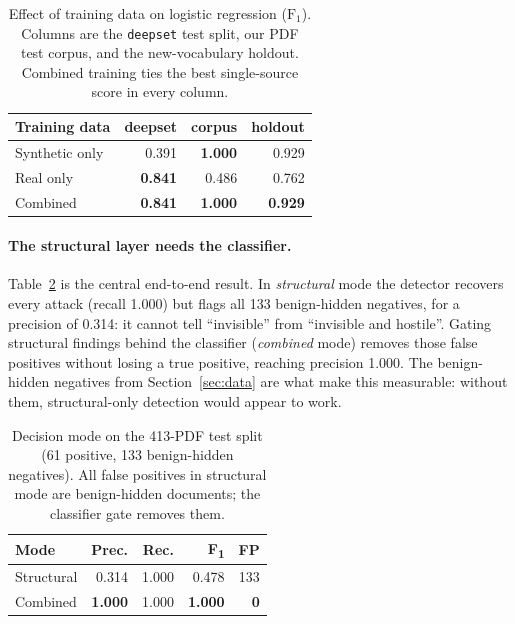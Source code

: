 \documentclass[11pt]{article}
\begin{document}
\begin{table}[t]
  \centering
  \small
  \begin{tabular}{lrrr}
    \toprule
    \textbf{Training data} & \textbf{deepset} & \textbf{corpus} & \textbf{holdout} \\
    \midrule
    Synthetic only & 0.391 & \textbf{1.000} & 0.929 \\
    Real only      & \textbf{0.841} & 0.486 & 0.762 \\
    Combined       & \textbf{0.841} & \textbf{1.000} & \textbf{0.929} \\
    \bottomrule
  \end{tabular}
  \caption{Effect of training data on logistic regression ($\text{F}_1$).
  Columns are the \texttt{deepset} test split, our PDF test corpus, and the
  new-vocabulary holdout. Combined training ties the best single-source score
  in every column.}
  \label{tab:data}
\end{table}

\paragraph{The structural layer needs the classifier.}
Table~\ref{tab:mode} is the central end-to-end result. In \emph{structural}
mode the detector recovers every attack (recall 1.000) but flags all 133
benign-hidden negatives, for a precision of 0.314: it cannot tell ``invisible''
from ``invisible and hostile''. Gating structural findings behind the
classifier (\emph{combined} mode) removes those false positives without
losing a true positive, reaching precision 1.000. The benign-hidden negatives
from Section~\ref{sec:data} are what make this measurable: without them,
structural-only detection would appear to work.

\begin{table}[t]
  \centering
  \small
  \begin{tabular}{lrrrr}
    \toprule
    \textbf{Mode} & \textbf{Prec.} & \textbf{Rec.} & \textbf{F\textsubscript{1}} & \textbf{FP} \\
    \midrule
    Structural & 0.314 & 1.000 & 0.478 & 133 \\
    Combined   & \textbf{1.000} & 1.000 & \textbf{1.000} & \textbf{0} \\
    \bottomrule
  \end{tabular}
  \caption{Decision mode on the 413-PDF test split (61 positive, 133
  benign-hidden negatives). All false positives in structural mode are
  benign-hidden documents; the classifier gate removes them.}
  \label{tab:mode}
\end{table}
\end{document}
